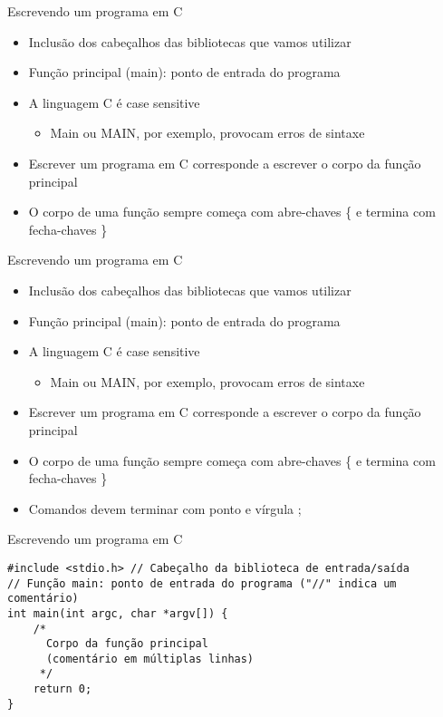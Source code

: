 \documentclass[t, aspectratio=169]{beamer}
\begin{document}
\begin{frame}[label={sec:org6c02b18}]{Escrevendo um programa em C}
\begin{itemize}
\item Inclusão dos cabeçalhos das bibliotecas que vamos utilizar
\item Função principal (\alert{main}): ponto de entrada do programa
\item A linguagem C é \alert{case sensitive}
\begin{itemize}
\item \alert{Main} ou \alert{MAIN}, por exemplo, provocam erros de sintaxe
\end{itemize}
\item Escrever um programa em C corresponde a escrever o \alert{corpo} da função principal
\item O \alert{corpo} de uma função sempre começa com abre-chaves \alert{\{} e termina com fecha-chaves \alert{\}}
\end{itemize}
\end{frame}

\begin{frame}[label={sec:orgb70583e}]{Escrevendo um programa em C}
\begin{itemize}
\item Inclusão dos cabeçalhos das bibliotecas que vamos utilizar
\item Função principal (\alert{main}): ponto de entrada do programa
\item A linguagem C é \alert{case sensitive}
\begin{itemize}
\item \alert{Main} ou \alert{MAIN}, por exemplo, provocam erros de sintaxe
\end{itemize}
\item Escrever um programa em C corresponde a escrever o \alert{corpo} da função principal
\item O \alert{corpo} de uma função sempre começa com abre-chaves \alert{\{} e termina com fecha-chaves \alert{\}}
\item Comandos devem terminar com ponto e vírgula \alert{;}
\end{itemize}
\end{frame}

\begin{frame}[label={sec:orgf018a2f},fragile]{Escrevendo um programa em C}
 \vspace{-0.5cm}
\begin{verbatim}
#include <stdio.h> // Cabeçalho da biblioteca de entrada/saída
// Função main: ponto de entrada do programa ("//" indica um comentário)
int main(int argc, char *argv[]) {
    /*
      Corpo da função principal
      (comentário em múltiplas linhas)
     */
    return 0;
}
\end{verbatim}
\end{frame}
\end{document}

